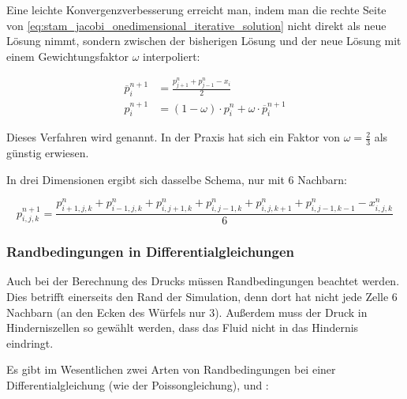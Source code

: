 Eine leichte Konvergenzverbesserung erreicht man, indem man die rechte Seite von
\autoref{eq:stam_jacobi_onedimensional_iterative_solution} nicht direkt als neue
Lösung nimmt, sondern zwischen der bisherigen Lösung und der neue Lösung mit
einem Gewichtungsfaktor $\omega$ interpoliert:

\begin{align}
\overline{p}_i^{n+1}
&=
\frac{
	p_{j+1}^{n} + p_{j-1}^{n} - x_i
}
{
	2
} \\
p_i^{n+1}
&=
(1-\omega) \cdot p_i^n + \omega \cdot \overline{p}_i^{n+1}
\end{align}

Dieses Verfahren wird  genannt. In
der Praxis hat sich ein Faktor von $\omega=\frac{2}{3}$ als günstig erwiesen.

In drei Dimensionen ergibt sich dasselbe Schema, nur mit 6 Nachbarn:

\begin{equation*}
p_{i,j,k}^{n+1}
=
\frac{
	p_{i+1,j,k}^n +
	p_{i-1,j,k}^n +
	p_{i,j+1,k}^n +
	p_{i,j-1,k}^n +
	p_{i,j,k+1}^n +
	p_{i,j-1,k-1}^n -
	x_{i,j,k}^n
}
{
	6
}
\end{equation*}

\subsubsection{Randbedingungen in Differentialgleichungen}

Auch bei der Berechnung des Drucks müssen Randbedingungen beachtet werden. Dies
betrifft einerseits den Rand der Simulation, denn dort hat nicht jede Zelle 6
Nachbarn (an den Ecken des Würfels nur 3). Außerdem muss der Druck in
Hinderniszellen so gewählt werden, dass das Fluid nicht in das Hindernis
eindringt.

Es gibt im Wesentlichen zwei Arten von Randbedingungen bei einer
Differentialgleichung (wie der Poissongleichung),
 und
:

